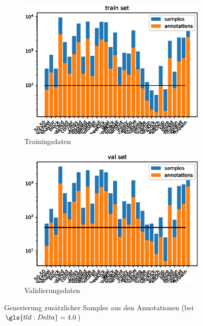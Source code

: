 \begin{figure}
    \centering
    \begin{subfigure}{.5\textwidth}
        \centering
        \includegraphics[width=.95\linewidth]{img/data-plots/4sec/class_distribution_annotations_train_202010-1419-3737.eps}
        \caption{Trainingsdaten}
    \end{subfigure}%
    \begin{subfigure}{.5\textwidth}
        \centering
        \includegraphics[width=.95\linewidth]{img/data-plots/4sec/class_distribution_annotations_val_202010-1419-3747.eps}
        \caption{Validierungsdaten}
    \end{subfigure}
    \caption{Generierung zusätzlicher Samples aus den Annotationen (bei $\gls{tld:Delta} = 4.0$)}
    \label{fig:samples}
\end{figure}

